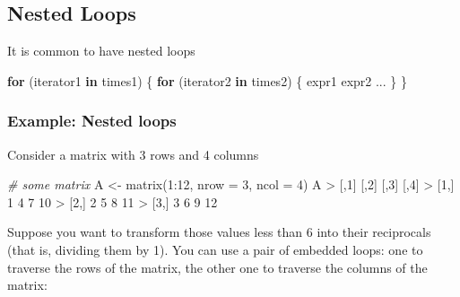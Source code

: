 \documentclass[
]{book}
\newenvironment{Shaded}{\begin{snugshade}}{\end{snugshade}}
\newcommand{\AttributeTok}[1]{\textcolor[rgb]{0.77,0.63,0.00}{#1}}
\newcommand{\CommentTok}[1]{\textcolor[rgb]{0.56,0.35,0.01}{\textit{#1}}}
\newcommand{\ControlFlowTok}[1]{\textcolor[rgb]{0.13,0.29,0.53}{\textbf{#1}}}
\newcommand{\DecValTok}[1]{\textcolor[rgb]{0.00,0.00,0.81}{#1}}
\newcommand{\FunctionTok}[1]{\textcolor[rgb]{0.00,0.00,0.00}{#1}}
\newcommand{\NormalTok}[1]{#1}
\newcommand{\OtherTok}[1]{\textcolor[rgb]{0.56,0.35,0.01}{#1}}
\newcommand{\SpecialCharTok}[1]{\textcolor[rgb]{0.00,0.00,0.00}{#1}}
\begin{document}
\hypertarget{nested-loops}{%
\subsection{Nested Loops}\label{nested-loops}}

It is common to have nested loops

\begin{Shaded}
\begin{Highlighting}[]
\ControlFlowTok{for}\NormalTok{ (iterator1 }\ControlFlowTok{in}\NormalTok{ times1) \{ }
  \ControlFlowTok{for}\NormalTok{ (iterator2 }\ControlFlowTok{in}\NormalTok{ times2) \{}
\NormalTok{    expr1}
\NormalTok{    expr2}
\NormalTok{    ...}
\NormalTok{  \}}
\NormalTok{\}}
\end{Highlighting}
\end{Shaded}

\hypertarget{example-nested-loops}{%
\subsubsection*{Example: Nested loops}\label{example-nested-loops}}

Consider a matrix with 3 rows and 4 columns

\begin{Shaded}
\begin{Highlighting}[]
\CommentTok{\# some matrix}
\NormalTok{A }\OtherTok{\textless{}{-}} \FunctionTok{matrix}\NormalTok{(}\DecValTok{1}\SpecialCharTok{:}\DecValTok{12}\NormalTok{, }\AttributeTok{nrow =} \DecValTok{3}\NormalTok{, }\AttributeTok{ncol =} \DecValTok{4}\NormalTok{)}
\NormalTok{A}
\SpecialCharTok{\textgreater{}}\NormalTok{      [,}\DecValTok{1}\NormalTok{] [,}\DecValTok{2}\NormalTok{] [,}\DecValTok{3}\NormalTok{] [,}\DecValTok{4}\NormalTok{]}
\SpecialCharTok{\textgreater{}}\NormalTok{ [}\DecValTok{1}\NormalTok{,]    }\DecValTok{1}    \DecValTok{4}    \DecValTok{7}   \DecValTok{10}
\SpecialCharTok{\textgreater{}}\NormalTok{ [}\DecValTok{2}\NormalTok{,]    }\DecValTok{2}    \DecValTok{5}    \DecValTok{8}   \DecValTok{11}
\SpecialCharTok{\textgreater{}}\NormalTok{ [}\DecValTok{3}\NormalTok{,]    }\DecValTok{3}    \DecValTok{6}    \DecValTok{9}   \DecValTok{12}
\end{Highlighting}
\end{Shaded}

Suppose you want to transform those values less than 6 into their reciprocals
(that is, dividing them by 1). You can use a pair of embedded loops: one to
traverse the rows of the matrix, the other one to traverse the columns of the
matrix:
\end{document}
